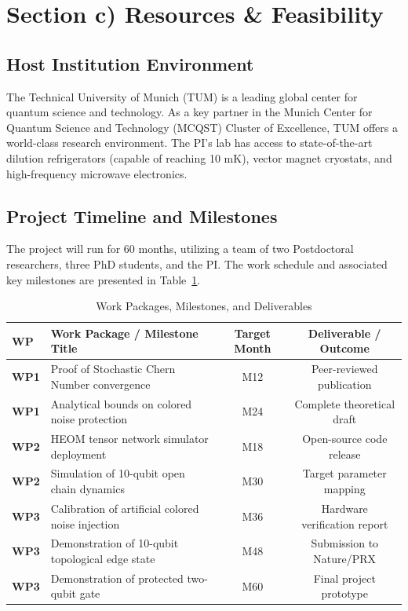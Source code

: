 \section{Section c) Resources \& Feasibility}

\subsection{Host Institution Environment}
The Technical University of Munich (TUM) is a leading global center for quantum science and technology. As a key partner in the Munich Center for Quantum Science and Technology (MCQST) Cluster of Excellence, TUM offers a world-class research environment. The PI's lab has access to state-of-the-art dilution refrigerators (capable of reaching 10 mK), vector magnet cryostats, and high-frequency microwave electronics.

\subsection{Project Timeline and Milestones}
The project will run for 60 months, utilizing a team of two Postdoctoral researchers, three PhD students, and the PI. The work schedule and associated key milestones are presented in Table~\ref{tab:milestones}.

\pbreak
\begin{table}[h]
\centering
\sffamily
\small
\renewcommand{\arraystretch}{1.2}
\begin{tabularx}{\linewidth}{l X c c}
\toprule
\rowcolor{ercbg}
\textbf{WP} & \textbf{Work Package / Milestone Title} & \textbf{Target Month} & \textbf{Deliverable / Outcome} \\
\midrule
\textbf{WP1} & Proof of Stochastic Chern Number convergence & M12 & Peer-reviewed publication \\
\textbf{WP1} & Analytical bounds on colored noise protection & M24 & Complete theoretical draft \\
\rowcolor{ercbg}
\textbf{WP2} & HEOM tensor network simulator deployment & M18 & Open-source code release \\
\textbf{WP2} & Simulation of 10-qubit open chain dynamics & M30 & Target parameter mapping \\
\rowcolor{ercbg}
\textbf{WP3} & Calibration of artificial colored noise injection & M36 & Hardware verification report \\
\textbf{WP3} & Demonstration of 10-qubit topological edge state & M48 & Submission to Nature/PRX \\
\rowcolor{ercbg}
\textbf{WP3} & Demonstration of protected two-qubit gate & M60 & Final project prototype \\
\bottomrule
\end{tabularx}
\caption{Work Packages, Milestones, and Deliverables}
\label{tab:milestones}
\end{table}

\vspace{1.5em}
